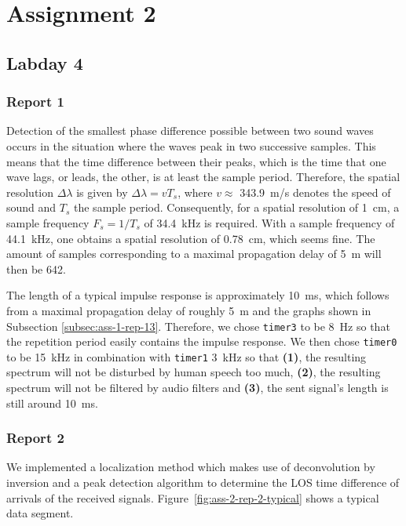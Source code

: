 \documentclass[11pt,titlepage]{report}
\begin{document}
\chapter{Assignment 2}
\section{Labday 4}

\subsection{Report 1}
\label{subsec:ass-2-rep-1}
Detection of the smallest phase difference possible between two sound waves occurs in the situation where the waves peak in two successive samples. This means that the time difference between their peaks, which is the time that one wave lags, or leads, the other, is at least the sample period. Therefore, the spatial resolution $\Delta \lambda$ is given by $\Delta \lambda = v T_s$, where $v \approx$ \SI{343.9}{m/s} denotes the speed of sound and $T_s$ the sample period. Consequently, for a spatial resolution of \SI{1}{cm}, a sample frequency $F_s = 1/T_s$ of \SI{34.4}{kHz} is required. With a sample frequency of \SI{44.1}{kHz}, one obtains a spatial resolution of \SI{0.78}{cm}, which seems fine. The amount of samples corresponding to a maximal propagation delay of \SI{5}{m} will then be \num{642}.

The length of a typical impulse response is approximately \SI{10}{ms}, which follows from a maximal propagation delay of roughly \SI{5}{m} and the graphs shown in Subsection \ref{subsec:ass-1-rep-13}. Therefore, we chose \texttt{timer3} to be \SI{8}{Hz} so that the repetition period easily contains the impulse response. We then chose \texttt{timer0} to be \SI{15}{kHz} in combination with \texttt{timer1} \SI{3}{kHz} so that \textbf{(1)}, the resulting spectrum will not be disturbed by human speech too much, \textbf{(2)}, the resulting spectrum will not be filtered by audio filters and \textbf{(3)}, the sent signal's length is still around \SI{10}{ms}.

\subsection{Report 2}
We implemented a localization method which makes use of deconvolution by inversion and a peak detection algorithm to determine the LOS time difference of arrivals of the received signals. Figure~\ref{fig:ass-2-rep-2-typical} shows a typical data segment.
\end{document}
